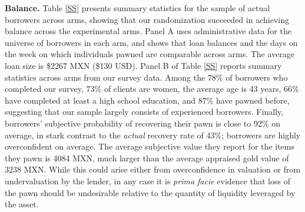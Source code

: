 \documentclass[ecta,nameyear,final]{econsocart}
\begin{document}

    
\noindent \textbf{Balance.} Table \ref{SS} presents summary statistics for the sample of actual borrowers across arms, showing that our randomization succeeded in achieving balance across the experimental arms. Panel A uses administrative data for the universe of borrowers in each arm, and shows that loan balances and the days on the week on which individuals pawned are comparable across arms. The average loan size is \$2267 MXN (\$130 USD). Panel B of Table \ref{SS} reports summary statistics across arms from our survey data. Among the 78\% of borrowers who completed our survey, 73\% of clients are women, the average age is 43 years, 66\% have completed at least a high school education, and 87\% have pawned before, suggesting that our sample largely consists of experienced borrowers. Finally, borrowers' subjective probability of recovering their pawn is close to 92\% on average, in stark contrast to the \emph{actual} recovery rate of 43\%; borrowers are highly overconfident on average. The average subjective value they report for the items they pawn is 4084 MXN, much larger than the average appraised gold value of 3238 MXN. While this could arise either from overconfidence in valuation or from undervaluation by the lender, in any case it is \textit{prima facie} evidence that loss of the pawn should be undesirable relative to the quantity of liquidity leveraged by the asset. 
\end{document}
